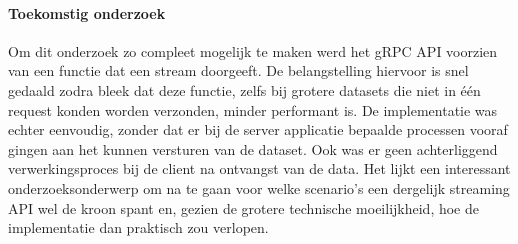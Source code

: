 \paragraph{Toekomstig onderzoek}
Om dit onderzoek zo compleet mogelijk te maken werd het gRPC API voorzien van een functie dat een stream doorgeeft.
De belangstelling hiervoor is snel gedaald zodra bleek dat deze functie, zelfs bij grotere datasets die niet in één request konden worden verzonden, minder performant is.
De implementatie was echter eenvoudig, zonder dat er bij de server applicatie bepaalde processen vooraf gingen aan het kunnen versturen van de dataset.
Ook was er geen achterliggend verwerkingsproces bij de client na ontvangst van de data.
Het lijkt een interessant onderzoeksonderwerp om na te gaan voor welke scenario's een dergelijk streaming API wel de kroon spant en,
gezien de grotere technische moeilijkheid, hoe de implementatie dan praktisch zou verlopen.
